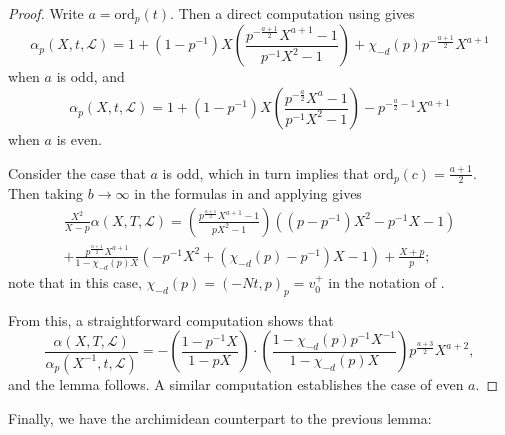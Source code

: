 \documentclass[reqno,oneside]{amsart}
\theoremstyle{plain}
\theoremstyle{remark}
\numberwithin{theorem}{section}
\newcommand{\calL}{\mathcal L}
\newcommand{\ord}{\mathrm{ord}}
\begin{document}
\begin{proof}
		Write $a = \ord_p(t)$. Then a direct computation using \cite[Proposition 3.1]{YangLocal} gives
		\begin{equation} \label{eqn:alpha rank 1 level a odd}
		\alpha_p(X, t, \calL) = 1 + (1-p^{-1} ) X \left( \frac{ p^{-\frac{a+1}{2}} X^{a+1} - 1 }{p^{-1}X^2 - 1}   \right) + \chi_{-d}(p) p^{- \frac{a+1}{2}} X^{a+1}
		\end{equation}
		when $a$ is odd, and
		\begin{equation} \label{eqn:alpha rank 1 level a even}
		\alpha_p(X, t, \calL) = 1 + (1-p^{-1} ) X \left( \frac{ p^{-\frac{a}{2}} X^{a} - 1 }{p^{-1}X^2 - 1}   \right)  -  p^{- \frac{a }{2}-1} X^{a+1}
		\end{equation}	
		when $a$ is even.
		
		Consider the case that $a $ is odd, which in turn implies that $\ord_p(c) = \frac{a+1}2$.
		Then taking $b \to \infty$ in the formulas in  and applying  gives
		\begin{multline}
		\frac{X^2}{X-p} \alpha(X, T, \calL) =
		\left( \frac{p^{\frac{a+1}2} X^{a+1} - 1}{p X^2 -1} \right) \left( (p - p^{-1}) X^2 - p^{-1}X -1 \right) \\
	  + \frac{p^{\frac{a+1}{2}} X^{a+1}}{1 - \chi_{-d}(p) X}  \left( - p^{-1} X^2 + (\chi_{-d}(p) - p^{-1})X - 1 \right) + \frac{ X+p}{p};
		\end{multline}
		note that in this case, $\chi_{-d}(p) = (-Nt, p)_p = v_0^+$ in the notation of .	
		
		From this, a straightforward computation shows that
		\begin{equation}
		\frac{\alpha(X,T, \calL)}{\alpha_p(X^{-1}, t, \calL)} = - \left( \frac{1-p^{-1}X}{1-pX} \right) \cdot \left( \frac{1 - \chi_{-d}(p)p^{-1}X^{-1}}{1- \chi_{-d}(p)X} \right)p^{\frac{a+3}2} X^{a+2},
		\end{equation}
		and the lemma follows. A similar computation establishes the case of even $a$.
	\end{proof}
	
	Finally, we have the archimidean counterpart to the previous lemma:
	
\end{document}
